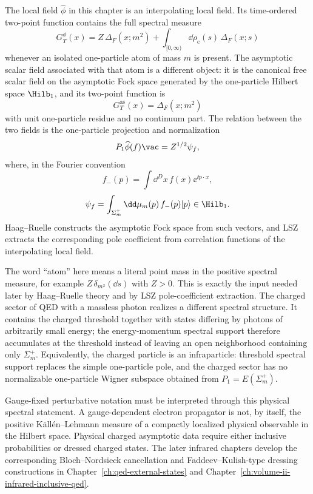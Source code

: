 The local field \(\widehat\phi\) in this chapter is an interpolating local
field.  Its time-ordered two-point function contains the full spectral measure
\[
  G_T^\phi(x)
  =
  Z\,\Delta_F(x;m^2)
  +
  \int_{[0,\infty)}\dd\rho_{\mathrm c}(s)\,\Delta_F(x;s)
\]
whenever an isolated one-particle atom of mass \(m\) is present.  The
asymptotic scalar field associated with that atom is a different object: it is
the canonical free scalar field on the asymptotic Fock space generated by the
one-particle Hilbert space \(\Hilb_1\), and its two-point function is
\[
  G_T^{\mathrm{as}}(x)=\Delta_F(x;m^2)
\]
with unit one-particle residue and no continuum part.  The relation between the
two fields is the one-particle projection and normalization
\[
  P_1\widehat\phi(f)\vac
  =
  Z^{1/2}\psi_f,
\]
where, in the Fourier convention
\[
  f_-(p)=\int\dd^D x\,f(x)\ee^{\ii p\cdot x},
\]
\[
  \psi_f=
  \int_{\Sigma_m^+}\dd\mu_m(p)\,f_-(p)|p\rangle
  \in\Hilb_1 .
\]
Haag--Ruelle constructs the asymptotic Fock space from such vectors, and LSZ
extracts the corresponding pole coefficient from correlation functions of the
interpolating local field.

\begin{remark}
The word ``atom'' here means a literal point mass in the positive spectral
measure, for example \(Z\,\delta_{m^2}(\dd s)\) with \(Z>0\).  This is exactly
the input needed later by Haag--Ruelle theory and by LSZ pole-coefficient
extraction.  The
charged sector of QED with a massless photon realizes a different spectral
structure.  It contains the charged threshold together with states differing by
photons of arbitrarily small energy; the energy-momentum spectral support
therefore accumulates at the threshold instead of leaving an open neighborhood
containing only \(\Sigma_m^+\).  Equivalently, the charged particle is an
infraparticle: threshold spectral support replaces the simple one-particle
pole, and the charged sector has no normalizable one-particle Wigner subspace
obtained from \(P_1=E(\Sigma_m^+)\).

Gauge-fixed perturbative notation must be interpreted through this physical
spectral statement.  A gauge-dependent electron propagator is not, by itself,
the positive K\"all\'en--Lehmann measure of a compactly localized physical
observable in the Hilbert space.  Physical charged asymptotic data require
either inclusive probabilities or dressed charged states.  The later infrared
chapters develop the corresponding Bloch--Nordsieck cancellation and
Faddeev--Kulish-type dressing constructions in
Chapter~\ref{ch:qed-external-states} and
Chapter~\ref{ch:volume-ii-infrared-inclusive-qed}.
\end{remark}

